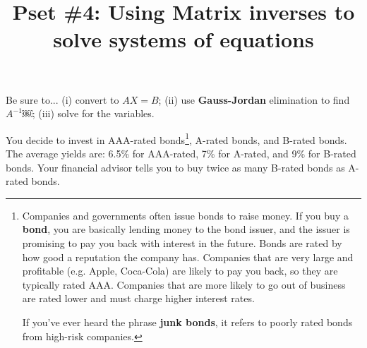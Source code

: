 \documentclass{exam}
\title{Pset \#4: Using Matrix inverses to solve systems of equations  }
\author{  }
\begin{document}
\maketitle
\thispagestyle{empty}

\begin{questions}
\question
Be sure to...  (i) convert to $AX=B$; (ii) use \textbf{Gauss-Jordan} elimination to find $A^{-1}$￼; (iii) solve for the variables.
\vspace{0.5cm}

\question


You decide to invest in AAA-rated bonds\footnote{Companies and governments often issue bonds to raise money.  If you buy a  \textbf{bond}, you are basically lending money to the bond issuer, and the issuer is promising to pay you back with interest in the future.  Bonds are rated by how good a reputation the company has. Companies that are very large and profitable (e.g. Apple, Coca-Cola) are likely to pay you back, so they are typically rated AAA. Companies that are more likely to go out of business are rated lower and must charge higher interest rates.

If you've ever heard the phrase \textbf{junk bonds}, it refers to poorly rated bonds from high-risk companies.}, A-rated bonds, and B-rated bonds.  The average yields are: 6.5\% for AAA-rated, 7\% for A-rated, and 9\% for B-rated bonds. Your financial advisor tells you to buy twice as many B-rated bonds as A-rated bonds.

\end{questions}


\thispagestyle{empty}
\end{document}
